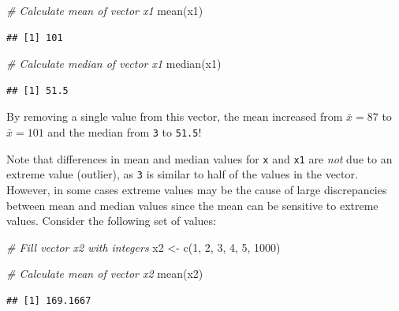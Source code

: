 \documentclass[
]{book}
\newenvironment{Shaded}{\begin{snugshade}}{\end{snugshade}}
\newcommand{\CommentTok}[1]{\textcolor[rgb]{0.56,0.35,0.01}{\textit{#1}}}
\newcommand{\DecValTok}[1]{\textcolor[rgb]{0.00,0.00,0.81}{#1}}
\newcommand{\FunctionTok}[1]{\textcolor[rgb]{0.00,0.00,0.00}{#1}}
\newcommand{\NormalTok}[1]{#1}
\newcommand{\OtherTok}[1]{\textcolor[rgb]{0.56,0.35,0.01}{#1}}
\begin{document}
\begin{Shaded}
\begin{Highlighting}[]
\CommentTok{\# Calculate mean of vector x1}
\FunctionTok{mean}\NormalTok{(x1)}
\end{Highlighting}
\end{Shaded}

\begin{verbatim}
## [1] 101
\end{verbatim}

\begin{Shaded}
\begin{Highlighting}[]
\CommentTok{\# Calculate median of vector x1}
\FunctionTok{median}\NormalTok{(x1)}
\end{Highlighting}
\end{Shaded}

\begin{verbatim}
## [1] 51.5
\end{verbatim}

By removing a single value from this vector, the mean increased from \(\bar{x} = 87\) to \(\bar{x} = 101\) and the median from \texttt{3} to \texttt{51.5}!

Note that differences in mean and median values for \texttt{x} and \texttt{x1} are \emph{not} due to an extreme value (outlier), as \texttt{3} is similar to half of the values in the vector. However, in some cases extreme values may be the cause of large discrepancies between mean and median values since the mean can be sensitive to extreme values. Consider the following set of values:

\begin{Shaded}
\begin{Highlighting}[]
\CommentTok{\# Fill vector x2 with integers}
\NormalTok{x2 }\OtherTok{\textless{}{-}} \FunctionTok{c}\NormalTok{(}\DecValTok{1}\NormalTok{, }\DecValTok{2}\NormalTok{, }\DecValTok{3}\NormalTok{, }\DecValTok{4}\NormalTok{, }\DecValTok{5}\NormalTok{, }\DecValTok{1000}\NormalTok{)}
\end{Highlighting}
\end{Shaded}

\begin{Shaded}
\begin{Highlighting}[]
\CommentTok{\# Calculate mean of vector x2}
\FunctionTok{mean}\NormalTok{(x2)}
\end{Highlighting}
\end{Shaded}

\begin{verbatim}
## [1] 169.1667
\end{verbatim}
\end{document}
